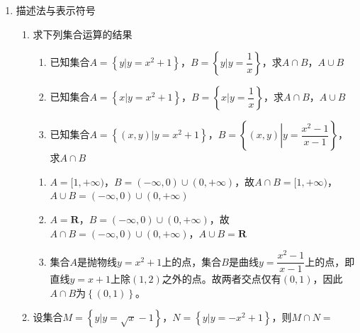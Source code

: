 \begin{enumerate}
\begin{enumerate}
\begin{jieda}
        \end{jieda}
        \item 已知全集$U = \left\{x | x \leq 4\right\}$，集合$A = \left\{x | -2 < x < 3\right\}, B = \left\{x | -3 \leq x \leq 2\right\}$，求$A \cap B, \quad \overline{A}\cup B, \quad A\cap\overline{B}$
        \begin{jieda}
            $A = (-2,3), B = [-3,2], \overline{A} = (-\infty, -2] \cup [3, 4], \overline{B} = (-\infty, -3) \cup (2, 4]$ \\
            故$A \cap B = (-2, 2], \quad \overline{A}\cup B = (-\infty, -2] \cup [3, 4],\quad  A\cap\overline{B} = (2, 3)$
        \end{jieda}
    \end{enumerate}
    \item 描述法与表示符号
    \begin{enumerate}
        \item 求下列集合运算的结果
            \begin{enumerate}
                \item 已知集合$A = \left\{y | y = x^2+1\right\}$，$B = \left\{y | y = \dfrac{1}{x}\right\}$，求$A \cap B$，$A \cup B$
                \item 已知集合$A = \left\{x | y = x^2+1\right\}$，$B = \left\{x | y = \dfrac{1}{x}\right\}$，求$A \cap B$，$A \cup B$
                \item 已知集合$A = \left\{(x, y) | y = x^2+1\right\}$，$B = \left\{(x, y) \left| y = \dfrac{x^2-1}{x-1}\right. \right\}$，求$A \cap B$
            \end{enumerate}
            \begin{jieda}
                \begin{enumerate}
                    \item $A = [1, +\infty)$，$B = (-\infty, 0) \cup (0, +\infty)$，故$A \cap B = [1, +\infty)$，$A \cup B = (-\infty, 0) \cup (0, +\infty)$
                    \item $A = \mathbf{R}$，$B = (-\infty, 0) \cup (0, +\infty)$，故$A \cap B = (-\infty, 0) \cup (0, +\infty)$，$A \cup B = \mathbf{R}$
                    \item 集合$A$是抛物线$y = x^2+1$上的点，集合$B$是曲线$y = \dfrac{x^2-1}{x-1}$上的点，即直线$y = x+1$上除$(1,2)$之外的点。故两者交点仅有$(0, 1)$，因此$A \cap B$为$\left\{(0,1)\right\}$。
                \end{enumerate}
            \end{jieda}
        \item 设集合$M = \left\{y | y = \sqrt{x} - 1 \right\}， N = \left\{y | y = -x^2+1 \right\}$，则$M \cap N = $\blkda{$[-1, 1]$}

\end{enumerate}
\end{enumerate}
